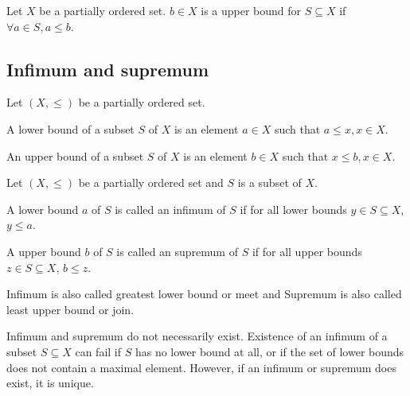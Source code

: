 \begin{definition}\label{def:upper_bound_partially_ordered_set}
Let $X$ be a partially ordered set. $b \in X$ is a upper bound for $S\subseteq X$ if $\forall a\in S, a\leq b$.
\end{definition}

\subsection{Infimum and supremum}


\begin{definition}
Let $(X,\leq)$ be a partially ordered set.

A lower bound of a subset $S$ of $X$ is an element $a\in X$ such that $a\leq x,x\in X$.

An upper bound of a subset $S$ of $X$ is an element $b\in X$ such that $x\leq b,x\in X$.
\end{definition}

\begin{definition}\label{def:infimum_supremum}
Let $(X,\leq)$ be a partially ordered set and $S$ is a subset of $X$.

A lower bound $a$ of $S$ is called an infimum of $S$ if for all lower bounds $y\in S\subseteq X$, $y\leq a$. %

A upper bound $b$ of $S$ is called an supremum of $S$ if for all upper bounds $z\in S\subseteq X$, $b\leq z$. %

Infimum is also called greatest lower bound or meet and Supremum is also called least upper bound or join.
\end{definition}

\begin{remark}
Infimum and supremum do not necessarily exist. Existence of an infimum of a subset $S\subseteq X$ can fail if $S$ has no lower bound at all, or if the set of lower bounds does not contain a maximal element. However, if an infimum or supremum does exist, it is unique.
\end{remark}

